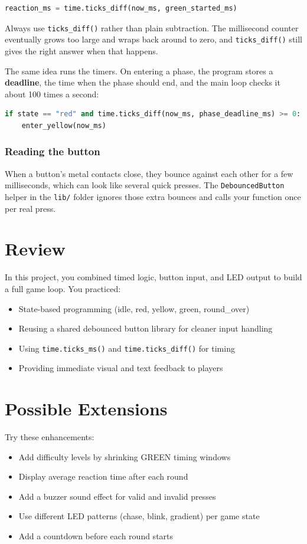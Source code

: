 \begin{lstlisting}[language=Python, caption=Measuring your reaction time]
reaction_ms = time.ticks_diff(now_ms, green_started_ms)
\end{lstlisting}

Always use \texttt{ticks\_diff()} rather than plain subtraction. The millisecond counter eventually
grows too large and wraps back around to zero, and \texttt{ticks\_diff()} still gives the right answer
when that happens.

The same idea runs the timers. On entering a phase, the program stores a \textbf{deadline}, the time
when the phase should end, and the main loop checks it about 100 times a second:

\begin{lstlisting}[language=Python, caption=Moving from red to yellow when time is up]
if state == "red" and time.ticks_diff(now_ms, phase_deadline_ms) >= 0:
    enter_yellow(now_ms)
\end{lstlisting}

\subsubsection{Reading the button}
When a button's metal contacts close, they bounce against each other for a few milliseconds, which
can look like several quick presses. The \texttt{DebouncedButton} helper in the \texttt{lib/} folder
ignores those extra bounces and calls your function once per real press.

\section{Review}
In this project, you combined timed logic, button input, and LED output to build a full game loop.
You practiced:
\begin{itemize}
    \item State-based programming (idle, red, yellow, green, round\_over)
    \item Reusing a shared debounced button library for cleaner input handling
    \item Using \texttt{time.ticks\_ms()} and \texttt{time.ticks\_diff()} for timing
    \item Providing immediate visual and text feedback to players
\end{itemize}

\section{Possible Extensions}
Try these enhancements:
\begin{itemize}
    \item Add difficulty levels by shrinking GREEN timing windows
    \item Display average reaction time after each round
    \item Add a buzzer sound effect for valid and invalid presses
    \item Use different LED patterns (chase, blink, gradient) per game state
    \item Add a countdown before each round starts
\end{itemize}
